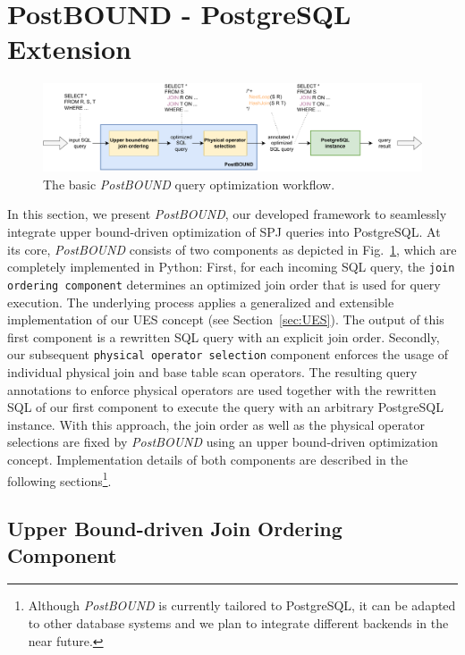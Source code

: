\section{PostBOUND - PostgreSQL Extension}
\label{sec:PostBound}

\begin{figure}[tb]
	\centering
	\includegraphics[width=0.95\linewidth]{figures/postbound-workflow-rework.pdf}
	\caption{The basic \emph{PostBOUND} query optimization workflow.}
	\label{fig:postbound-workflow}
\end{figure}

In this section, we present \emph{PostBOUND}, our developed framework to seamlessly integrate upper bound-driven optimization of SPJ queries into PostgreSQL.
At its core, \emph{PostBOUND} consists of two components as depicted in Fig.~\ref{fig:postbound-workflow}, which are completely implemented in Python: 
First, for each incoming SQL query, the \texttt{join ordering component} determines an optimized join order that is used for query execution. 
The underlying process applies a generalized and extensible implementation of our UES concept (see Section~\ref{sec:UES}). 
The output of this first component is a rewritten SQL query with an explicit join order.
Secondly, our subsequent \texttt{physical operator selection} component enforces the usage of individual physical join and base table scan operators. 
The resulting query annotations to enforce physical operators are used together with the rewritten SQL of our first component to execute the query with an arbitrary PostgreSQL instance.
With this approach, the join order as well as the physical operator selections are fixed by \emph{PostBOUND} using an upper bound-driven optimization concept. 
Implementation details of both components are described in the following sections\footnote{ 
Although \emph{PostBOUND} is currently tailored to PostgreSQL, it can be adapted to other database systems and we plan to integrate different backends in the near future.}.

\subsection{Upper Bound-driven Join Ordering Component}
\label{sec:postbound-join-ordering}


